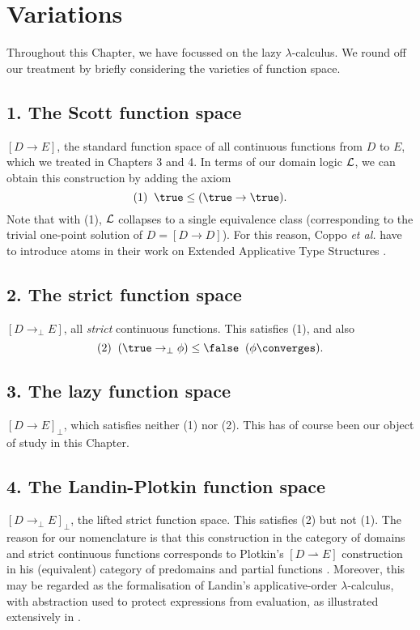 \section{Variations}

Throughout this Chapter, we have focussed on the lazy $\lambda$-calculus. 
We round off our treatment by briefly considering the varieties of function space.

\subsection*{1. The Scott function space}
$[D \rightarrow E]$, the standard function space of all continuous functions from $D$ to $E$, 
which we treated in Chapters 3 and 4. 
In terms of our domain logic $\cal L$, we can obtain this construction by adding the axiom
\[ (1) \;\; \true \leq ( \true \rightarrow \true ) . \]
Note that with (1), $\cal L$ collapses to a single equivalence class (corresponding to the trivial one-point solution of $D = [ D \rightarrow D]$). 
For this reason, Coppo {\it et al.} have to introduce atoms in their work on Extended Applicative Type Structures \cite{CDHL84}.

\subsection*{2. The strict function space}
$[D \rightarrow_{\bot} E]$, all {\em strict} continuous functions. 
This satisfies (1), and also
\[ (2) \;\; ( \true \rightarrow_{\bot} \phi ) \leq \false \;\; (\phi \converges ) . \]

\subsection*{3. The lazy function space}
$[D \rightarrow E]_{\bot}$, which satisfies neither (1) nor (2). 
This has of course been our object of study in this Chapter.

\subsection*{4. The Landin-Plotkin function space}
$[D \rightarrow_{\bot} E]_{\bot}$, the lifted strict function space. 
This satisfies (2) but not (1). 
The reason for our nomenclature is that this construction in the category of 
domains and strict continuous functions corresponds to Plotkin's 
$[D \rightharpoonup E]$ construction in his (equivalent) category of 
predomains and partial functions \cite{Plo85}.
Moreover, this may be regarded as the formalisation of Landin's applicative-order $\lambda$-calculus, 
with abstraction used to protect expressions from evaluation, as illustrated extensively in \cite{Lan64,Lan65,Bur75}.

